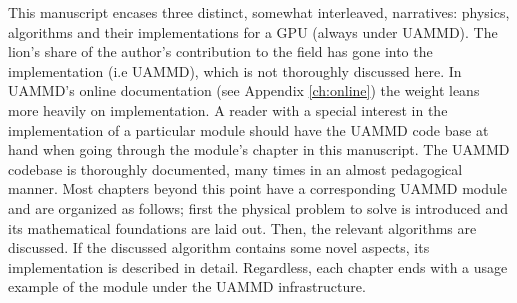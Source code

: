 \documentclass[twoside,openright,titlepage,numbers=noenddot,%
headinclude,footinclude,cleardoublepage=empty,abstract=on,
BCOR=5mm,fontsize=11pt, dvipsnames, paper=b5
]{scrreprt}
\begin{document}
%
%
This manuscript encases three distinct, somewhat interleaved, narratives: physics, algorithms and their implementations for a GPU (always under UAMMD).
The lion's share of the author's contribution to the field has gone into the implementation (i.e UAMMD), which is not thoroughly discussed here. In UAMMD's online documentation (see Appendix \ref{ch:online}) the weight leans more heavily on implementation. A reader with a special interest in the implementation of a particular module should have the UAMMD code base at hand when going through the module's chapter in this manuscript. The UAMMD codebase is thoroughly documented, many times in an almost pedagogical manner.
Most chapters beyond this point have a corresponding UAMMD module and are organized as follows; first the physical problem to solve is introduced and its mathematical foundations are laid out. Then, the relevant algorithms are discussed. If the discussed algorithm contains some novel aspects, its implementation is described in detail. Regardless, each chapter ends with a usage example of the module under the UAMMD infrastructure.

\end{document}
